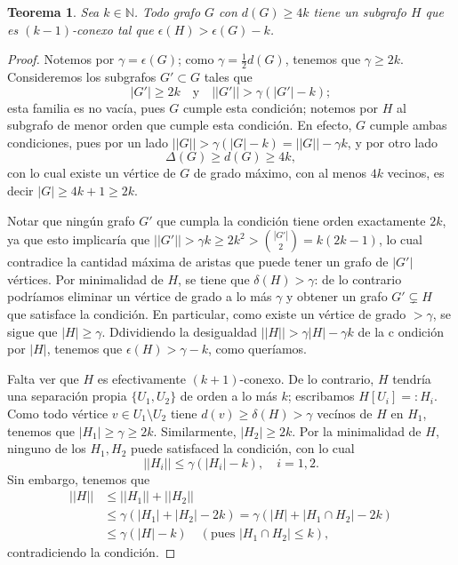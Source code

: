 \documentclass[12pt]{report}
\theoremstyle{plain}
\newtheorem{theorem}{Teorema}[section]
\theoremstyle{definition}
\newcommand{\naturals}{\mathbb{N}}
\newcommand{\abs}[1]{\left \vert #1 \right \vert}
\newcommand{\Abs}[1]{\left \vert \left \vert #1 \right \vert \right \vert}
\begin{document}
\begin{theorem}
Sea $k \in \naturals$. Todo grafo $G$ con $d(G) \geq 4 k$ tiene un subgrafo $H$ que es $(k-1)$-conexo tal que $\epsilon (H) > \epsilon (G) -k$.
\end{theorem}
\begin{proof}
Notemos por $\gamma = \epsilon (G)$; como $\gamma = \frac 1 2 d(G)$, tenemos que $\gamma \geq 2 k$. Consideremos los subgrafos $G' \subset G$ tales que
\[
\abs{G'} \geq 2k \quad \text{y} \quad \Abs{G'}> \gamma ( \abs{G'}-k);
\]
esta familia es no vacía, pues $G$ cumple esta condición; notemos por $H$ al subgrafo de menor orden que cumple esta condición.
En efecto, $G$ cumple ambas condiciones, pues por un lado $\Abs G > \gamma (\abs G - k) = \Abs G - \gamma k$, y por otro lado
$$
\Delta (G) \geq d(G) \geq 4k,
$$
con lo cual existe un vértice de $G$ de grado máximo, con al menos $4k$ vecinos, es decir $\abs G \geq 4k +1 \geq 2k$.

Notar que ningún grafo $G'$ que cumpla la condición tiene orden exactamente $2k$, ya que esto implicaría que $\Abs {G'} > \gamma k \geq 2k^2 > \binom{\abs {G'}}{2} = k(2k-1)$, lo cual contradice la cantidad máxima de aristas que puede tener un grafo de $\abs{G'}$ vértices.
Por minimalidad de $H$, se tiene que $\delta (H) > \gamma$: de lo contrario podríamos eliminar un vértice de grado a lo más $\gamma$ y obtener un grafo $G' \subsetneq H$ que satisface la condición. En particular, como existe un vértice de grado $> \gamma$, se sigue que $\abs H \geq \gamma$. Ddividiendo la desigualdad $\Abs H > \gamma \abs H - \gamma k$ de la c ondición por $\abs H$, tenemos que $\epsilon (H) > \gamma - k$, como queríamos.

Falta ver que $H$ es efectivamente $(k+1)$-conexo. De lo contrario, $H$ tendría una separación propia $\{U_1, U_2\}$ de orden a lo más $k$; escribamos $H[U_i] =: H_i$. Como todo vértice $v \in U_1 \setminus U_{2}$ tiene $d(v) \geq \delta (H) > \gamma$ vecínos de $H$ en $H_1$, tenemos que $\abs{H_1}\geq \gamma \geq 2k$. Similarmente, $\abs{H_2} \geq 2k$. Por la minimalidad de $H$, ninguno de los $H_1,H_2$ puede satisfaced la condición, con lo cual
\[
\Abs {H_i} \leq \gamma (\abs{H_i}-k), \quad i = 1,2.
\]
Sin embargo, tenemos que
\begin{align*}
\Abs H &\leq \Abs {H_1} + \Abs{H_2} \\
&\leq \gamma (\abs {H_1} + \abs{H_2} -2k) = \gamma (\abs{H}+ \abs{H_1 \cap H_2}-2k) \\
&\leq \gamma (\abs H - k) \quad (\text{pues $\abs{H_1\cap H_2} \leq k$}),
\end{align*}
contradiciendo la condición.
\end{proof}
\end{document}

